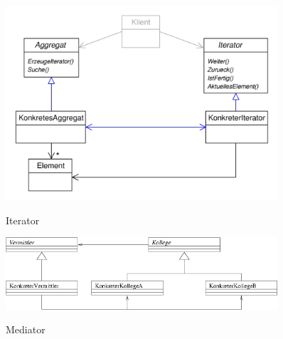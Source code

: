 \begin{figure}[htb]
	\centering
	\begin{minipage}[t]{0.45\linewidth}
		\centering
		\includegraphics[width=0.9\textwidth]{images/iterator}
		\label{fig:iterator}
		\caption{Iterator}
	\end{minipage}%
	\hfill
	\begin{minipage}[t]{0.45\linewidth}
		\centering
		\includegraphics[width=0.9\textwidth]{images/mediator}
		\label{fig:mediator}
		\caption{Mediator}
	\end{minipage}
\end{figure}

